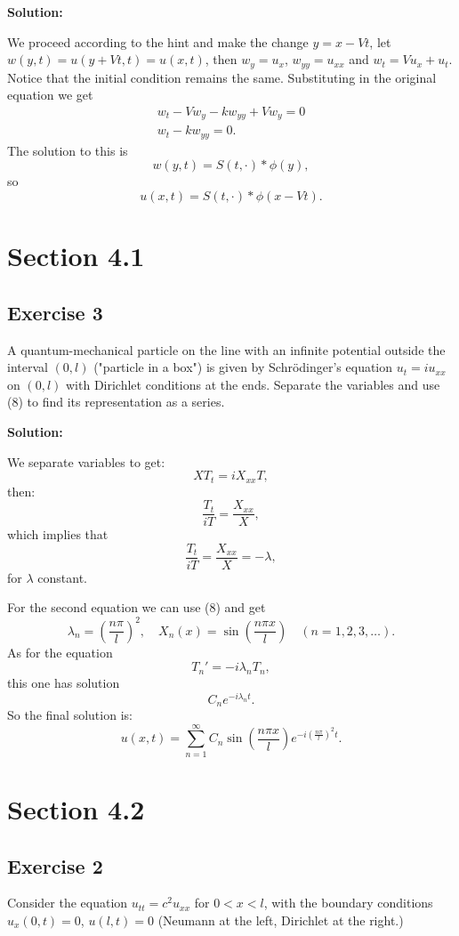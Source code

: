 \documentclass{article}
\begin{document}
\textbf{Solution:}

We proceed according to the hint and make the change $y=x-Vt$, let
$w(y,t)=u(y+Vt,t)=u(x,t)$, then $w_y=u_x$, $w_{yy}=u_{xx}$ and $w_t=Vu_x+u_t$.
Notice that the initial condition remains the same.
Substituting in the original equation we get
\begin{align*}
w_t-Vw_y -kw_{yy}+Vw_y=0\\
w_t-kw_{yy}=0.
\end{align*}
The solution to this is
\[
    w(y,t)=S(t,\cdot)\ast \phi(y),
\]
so
\[
    u(x,t)=S(t,\cdot)\ast \phi(x-Vt).
\]
\section{Section 4.1}
\subsection{Exercise 3}
A quantum-mechanical particle on the line with an infinite potential outside
the interval $(0,l)$ ("particle in a box") is given by Schr\"odinger's equation
$u_t=iu_{xx}$ on $(0,l)$ with Dirichlet conditions at the ends. Separate the
variables and use (8) to find its representation as a series.

\textbf{Solution:}


We separate variables to get:
\[
    XT_t=iX_{xx}T,
\]
then:
\[
    \frac{T_t}{iT}=\frac{X_{xx}}{X},
\]
which implies that
\[
    \frac{T_t}{iT}=\frac{X_{xx}}{X}=-\lambda,
\]
for $\lambda$ constant.

For the second equation we can use (8) and get
\[
    \lambda_n=\left(\frac{n\pi}{l}\right)^2,\quad X_n(x)=\sin\left(\frac{n\pi
    x}{l}\right) \quad (n=1,2,3,\dots).
\]
As for the equation
\[
    T_n'=-i\lambda_n T_n,
\]
this one has solution
\[
    C_ne^{-i\lambda_nt}.
\]
So the final solution is:
\[
    u(x,t)=\sum_{n=1}^\infty C_n\sin\left(\frac{n\pi
    x}{l}\right)e^{-i\left(\frac{n\pi}{l}\right)^2t}.
\]
\section{Section 4.2}
\subsection{Exercise 2}
Consider the equation $u_{tt}=c^2u_{xx}$ for $0<x<l$, with the boundary
conditions $u_x(0,t)=0$, $u(l,t)=0$ (Neumann at the left, Dirichlet at the right.)
\end{document}
